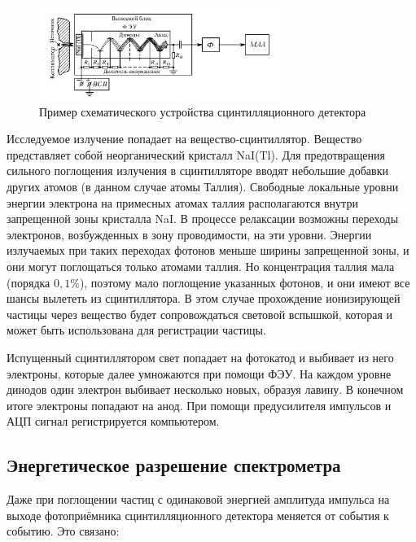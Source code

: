 \documentclass[a4paper, 12pt]{article}
\begin{document}
        \begin{figure}[h!]
            \begin{center}
                \includegraphics[width = 0.7\textwidth]{img/ust.png}
                \caption{Пример схематического устройства сцинтилляционного детектора}
                \label{img:ust}
            \end{center}
        \end{figure}

        Исследуемое излучение попадает на вещество-сцинтиллятор. Вещество представляет собой неорганический кристалл NaI(Tl). Для предотвращения сильного поглощения излучения в сцинтилляторе вводят небольшие добавки других атомов (в данном случае атомы Таллия). Свободные локальные уровни энергии электрона на примесных атомах таллия располагаются внутри запрещенной зоны кристалла NaI.
        В процессе релаксации возможны переходы электронов, возбужденных в зону проводимости, на эти уровни. Энергии излучаемых при таких переходах фотонов меньше ширины запрещенной зоны, и они могут поглощаться только атомами таллия. Но концентрация таллия мала (порядка $0,1\%$), поэтому мало поглощение указанных фотонов, и они имеют все шансы вылететь из сцинтиллятора. В этом случае прохождение ионизирующей частицы через вещество будет сопровождаться световой вспышкой, которая и может быть использована для регистрации частицы.

        Испущенный сцинтиллятором свет попадает на фотокатод и выбивает из него электроны, которые далее умножаются при помощи ФЭУ. На каждом уровне динодов один электрон выбивает несколько новых, образуя лавину. В конечном итоге электроны попадают на анод. При помощи предусилителя импульсов и АЦП сигнал регистрируется компьютером.

        \subsection{Энергетическое разрешение спектрометра}

            Даже при поглощении частиц с одинаковой энергией амплитуда импульса на выходе фотоприёмника сцинтилляционного детектора меняется от события к событию. Это связано:
\end{document}
